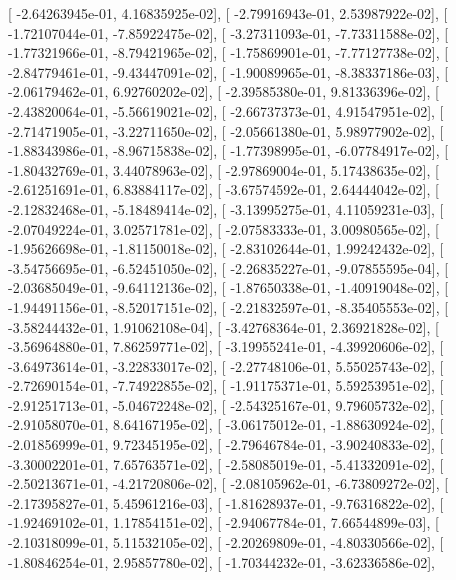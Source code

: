 \documentclass{article}
\begin{document}
       [ -2.64263945e-01,   4.16835925e-02],
       [ -2.79916943e-01,   2.53987922e-02],
       [ -1.72107044e-01,  -7.85922475e-02],
       [ -3.27311093e-01,  -7.73311588e-02],
       [ -1.77321966e-01,  -8.79421965e-02],
       [ -1.75869901e-01,  -7.77127738e-02],
       [ -2.84779461e-01,  -9.43447091e-02],
       [ -1.90089965e-01,  -8.38337186e-03],
       [ -2.06179462e-01,   6.92760202e-02],
       [ -2.39585380e-01,   9.81336396e-02],
       [ -2.43820064e-01,  -5.56619021e-02],
       [ -2.66737373e-01,   4.91547951e-02],
       [ -2.71471905e-01,  -3.22711650e-02],
       [ -2.05661380e-01,   5.98977902e-02],
       [ -1.88343986e-01,  -8.96715838e-02],
       [ -1.77398995e-01,  -6.07784917e-02],
       [ -1.80432769e-01,   3.44078963e-02],
       [ -2.97869004e-01,   5.17438635e-02],
       [ -2.61251691e-01,   6.83884117e-02],
       [ -3.67574592e-01,   2.64444042e-02],
       [ -2.12832468e-01,  -5.18489414e-02],
       [ -3.13995275e-01,   4.11059231e-03],
       [ -2.07049224e-01,   3.02571781e-02],
       [ -2.07583333e-01,   3.00980565e-02],
       [ -1.95626698e-01,  -1.81150018e-02],
       [ -2.83102644e-01,   1.99242432e-02],
       [ -3.54756695e-01,  -6.52451050e-02],
       [ -2.26835227e-01,  -9.07855595e-04],
       [ -2.03685049e-01,  -9.64112136e-02],
       [ -1.87650338e-01,  -1.40919048e-02],
       [ -1.94491156e-01,  -8.52017151e-02],
       [ -2.21832597e-01,  -8.35405553e-02],
       [ -3.58244432e-01,   1.91062108e-04],
       [ -3.42768364e-01,   2.36921828e-02],
       [ -3.56964880e-01,   7.86259771e-02],
       [ -3.19955241e-01,  -4.39920606e-02],
       [ -3.64973614e-01,  -3.22833017e-02],
       [ -2.27748106e-01,   5.55025743e-02],
       [ -2.72690154e-01,  -7.74922855e-02],
       [ -1.91175371e-01,   5.59253951e-02],
       [ -2.91251713e-01,  -5.04672248e-02],
       [ -2.54325167e-01,   9.79605732e-02],
       [ -2.91058070e-01,   8.64167195e-02],
       [ -3.06175012e-01,  -1.88630924e-02],
       [ -2.01856999e-01,   9.72345195e-02],
       [ -2.79646784e-01,  -3.90240833e-02],
       [ -3.30002201e-01,   7.65763571e-02],
       [ -2.58085019e-01,  -5.41332091e-02],
       [ -2.50213671e-01,  -4.21720806e-02],
       [ -2.08105962e-01,  -6.73809272e-02],
       [ -2.17395827e-01,   5.45961216e-03],
       [ -1.81628937e-01,  -9.76316822e-02],
       [ -1.92469102e-01,   1.17854151e-02],
       [ -2.94067784e-01,   7.66544899e-03],
       [ -2.10318099e-01,   5.11532105e-02],
       [ -2.20269809e-01,  -4.80330566e-02],
       [ -1.80846254e-01,   2.95857780e-02],
       [ -1.70344232e-01,  -3.62336586e-02],
\end{document}
